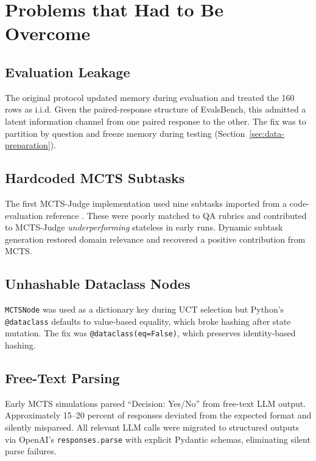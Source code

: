 \documentclass[12pt,a4paper]{report}
\begin{document}
\section{Problems that Had to Be Overcome}
\label{sec:problems}

\subsection{Evaluation Leakage}

The original protocol updated memory during evaluation and treated the 160 rows as i.i.d. Given the paired-response structure of EvalsBench, this admitted a latent information channel from one paired response to the other. The fix was to partition by question and freeze memory during testing (Section~\ref{sec:data-preparation}).

\subsection{Hardcoded MCTS Subtasks}

The first MCTS-Judge implementation used nine subtasks imported from a code-evaluation reference \cite{mcts_judge2025}. These were poorly matched to QA rubrics and contributed to MCTS-Judge \textit{underperforming} stateless in early runs. Dynamic subtask generation restored domain relevance and recovered a positive contribution from MCTS.

\subsection{Unhashable Dataclass Nodes}

\texttt{MCTSNode} was used as a dictionary key during UCT selection but Python's \texttt{@dataclass} defaults to value-based equality, which broke hashing after state mutation. The fix was \texttt{@dataclass(eq=False)}, which preserves identity-based hashing.

\subsection{Free-Text Parsing}

Early MCTS simulations parsed ``Decision: Yes/No'' from free-text LLM output. Approximately 15--20 percent of responses deviated from the expected format and silently misparsed. All relevant LLM calls were migrated to structured outputs via OpenAI's \texttt{responses.parse} with explicit Pydantic schemas, eliminating silent parse failures.
\end{document}
